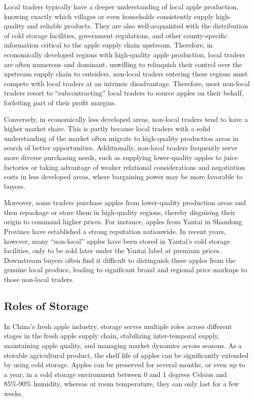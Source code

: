 Local traders typically have a deeper understanding of local apple production, knowing exactly which villages or even households consistently supply high-quality and reliable products. They are also well-acquainted with the distribution of cold storage facilities, government regulations, and other county-specific information critical to the apple supply chain upstream. Therefore, in economically developed regions with high-quality apple production, local traders are often numerous and dominant, unwilling to relinquish their control over the upstream supply chain to outsiders. non-local traders entering these regions must compete with local traders at an intrinsic disadvantage. Therefore, most non-local traders resort to ``subcontracting'' local traders to source apples on their behalf, forfeiting part of their profit margins.  

Conversely, in economically less developed areas, non-local traders tend to have a higher market share. This is partly because local traders with a solid understanding of the market often migrate to high-quality production areas in search of better opportunities. Additionally, non-local traders frequently serve more diverse purchasing needs, such as supplying lower-quality apples to juice factories or taking advantage of weaker relational considerations and negotiation costs in less developed areas, where bargaining power may be more favorable to buyers.  

Moreover, some traders purchase apples from lower-quality production areas and then repackage or store them in high-quality regions, thereby disguising their origin to command higher prices. For instance, apples from Yantai in Shandong Province have established a strong reputation nationwide. In recent years, however, many ``non-local'' apples have been stored in Yantai's cold storage facilities, only to be sold later under the Yantai label at premium prices. Downstream buyers often find it difficult to distinguish these apples from the genuine local produce, leading to significant brand and regional price markups to those non-local traders.


\subsection{Roles of Storage \label{Section: role of Storage}}
\noindent In China's fresh apple industry, storage serves multiple roles across different stages in the fresh apple supply chain, stabilizing inter-temporal supply, maintaining apple quality, and managing market dynamics across seasons. As a storable agricultural product, the shelf life of apples can be significantly extended by using cold storage. Apples can be preserved for several months, or even up to a year, in a cold storage environment between 0 and 1 degrees Celsius and 85\%-90\% humidity, whereas at room temperature, they can only last for a few weeks.

